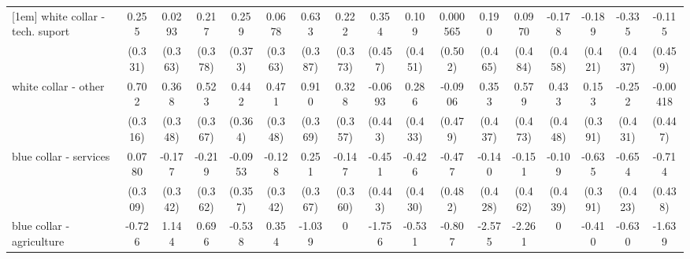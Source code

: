 {\begin{tabular}{l*{16}{c}}
[1em]
white collar - tech. suport&       0.255         &      0.0293         &       0.217         &       0.259         &      0.0678         &       0.633         &       0.222         &       0.354         &       0.109         &    0.000565         &       0.190         &      0.0970         &      -0.178         &      -0.189         &      -0.335         &      -0.115         \\
                    &     (0.331)         &     (0.363)         &     (0.378)         &     (0.373)         &     (0.363)         &     (0.387)         &     (0.373)         &     (0.457)         &     (0.451)         &     (0.502)         &     (0.465)         &     (0.484)         &     (0.458)         &     (0.421)         &     (0.437)         &     (0.459)         \\
[1em]
white collar - other&       0.702\sym{*}  &       0.368         &       0.523         &       0.442         &       0.471         &       0.910\sym{*}  &       0.328         &     -0.0693         &       0.286         &     -0.0906         &       0.353         &       0.579         &       0.433         &       0.153         &      -0.252         &    -0.00418         \\
                    &     (0.316)         &     (0.348)         &     (0.367)         &     (0.364)         &     (0.348)         &     (0.369)         &     (0.357)         &     (0.443)         &     (0.433)         &     (0.479)         &     (0.437)         &     (0.473)         &     (0.448)         &     (0.391)         &     (0.431)         &     (0.447)         \\
[1em]
blue collar - services&      0.0780         &      -0.177         &      -0.219         &     -0.0953         &      -0.128         &       0.251         &      -0.147         &      -0.451         &      -0.426         &      -0.477         &      -0.140         &      -0.151         &      -0.109         &      -0.635         &      -0.654         &      -0.714         \\
                    &     (0.309)         &     (0.342)         &     (0.362)         &     (0.357)         &     (0.342)         &     (0.367)         &     (0.360)         &     (0.443)         &     (0.430)         &     (0.482)         &     (0.428)         &     (0.462)         &     (0.439)         &     (0.391)         &     (0.423)         &     (0.438)         \\
[1em]
blue collar - agriculture&      -0.726         &       1.144         &       0.696         &      -0.538         &       0.354         &      -1.039         &           0         &      -1.756         &      -0.531         &      -0.807         &      -2.575\sym{*}  &      -2.261         &           0         &      -0.410         &      -0.630         &      -1.639         \\

\end{tabular}}
